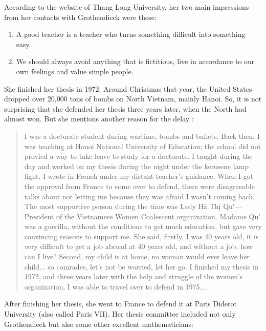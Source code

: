 \documentclass[reqno,12pt]{amsart}
\theoremstyle{definition}
\begin{document}
According to the website of Thang Long University, her two main impressions from her contacts with Grothendieck were these:

\begin{enumerate}
\item A good teacher is a teacher who turns something difficult into something easy.

\item We should always avoid anything that is fictitious, live in accordance to our own feelings and value simple people.
\end{enumerate}

She finished her thesis in 1972.   Around Christmas that year, the United States dropped over 20,000 tons of bombs on North Vietnam, mainly Hanoi.  So, it is not surprising that she defended her thesis three years later, when the North had almost won.   But she mentions another reason for the delay \cite{T19}:

\begin{quote}
I was a doctorate student during wartime, bombs and bullets. Back then, I was teaching at Hanoi National University of Education; the school did not provied a way to take leave to study for a doctorate. I taught during the day and worked on my thesis during the night under the kerosene lamp light. I wrote in French under my distant teacher's guidance. When I got the approval from France to come over to defend, there were disagreeable talks about not letting me because they was afraid I wasn't coming back. The most supportive person during the time was Lady H\`a Th\d i Qu{\selectfont  \'\ecircumflex}---President of the Vietnamese Women Coalescent organization. Madame Qu{\selectfont  \'\ecircumflex} was a guerilla, without the conditions to get much education, but gave very convincing reasons to support me.  She said, firstly, I was 40 years old, it is very difficult to get a job abroad at 40 years old, and without a job, how can I live? Second, my child is at home, no woman would ever leave her child... so comrades, let's not be worried, let her go.  I finished my thesis in 1972, and three years later with the help and struggle of the women's organization, I was able to travel over to defend in 1975....
\end{quote}

After finishing her thesis, she went to France to defend it at Paris Diderot University (also called Paris VII).  Her thesis committee included not only Grothendieck but also some other excellent mathematicians: 
\end{document}

